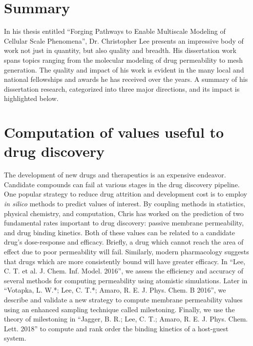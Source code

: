 \documentclass[12pt]{article}
\begin{document}
\section{Summary}
In his thesis entitled ``Forging Pathways to Enable Multiscale Modeling of Cellular Scale Phenomena'', Dr. Christopher Lee presents an impressive body of work not just in quantity, but also quality and breadth.
His dissertation work spans topics ranging from the molecular modeling of drug permeability to mesh generation.
The quality and impact of his work is evident in the many local and national fellowships and awards he has received over the years.
A summary of his dissertation research, categorized into three major directions, and its impact is highlighted below.

\section{Computation of values useful to drug discovery}
The development of new drugs and therapeutics is an expensive endeavor.
Candidate compounds can fail at various stages in the drug discovery pipeline.
One popular strategy to reduce drug attrition and development cost is to employ \textit{in silico} methods to predict values of interest.
By coupling methods in statistics, physical chemistry, and computation, Chris has worked on the prediction of two fundamental rates important to drug discovery: passive membrane permeability, and drug binding kinetics.
Both of these values can be related to a candidate drug's dose-response and efficacy.
Briefly, a drug which cannot reach the area of effect due to poor permeability will fail.
Similarly, modern pharmacology suggests that drugs which are more consistently bound will have greater efficacy.
In ``Lee, C. T. et al. J. Chem. Inf. Model. 2016'', we assess the efficiency and accuracy of several methods for computing permeability using atomistic simulations.
Later in ``Votapka, L. W.*; Lee, C. T.*; Amaro, R. E. J. Phys. Chem. B 2016'', we describe and validate a new strategy to compute membrane permeability values using an enhanced sampling technique called milestoning.
Finally, we use the theory of milestoning in ``Jagger, B. R.; Lee, C. T.; Amaro, R. E. J. Phys. Chem. Lett. 2018'' to compute and rank order the binding kinetics of a host-guest system.
\end{document}
